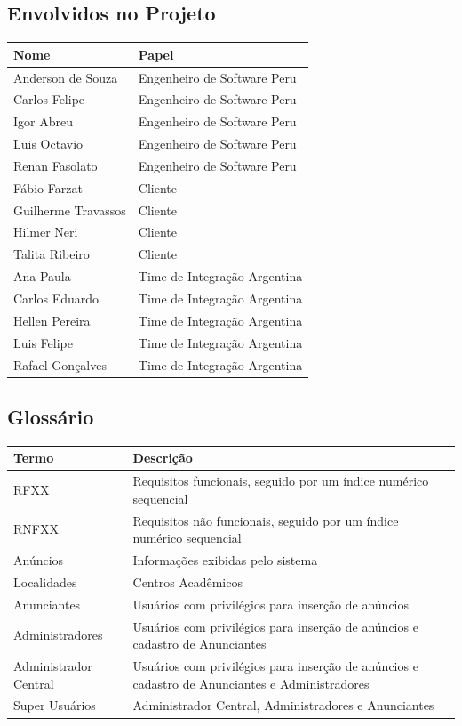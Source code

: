 \documentclass[a4paper, 12pt]{article}
\begin{document}
\subsection{Envolvidos no Projeto}
\begin{table}[ht]
	\centering

	\begin{tabular}{p{7cm}p{7cm}}
		\hline
		\cellcolor{gray}Nome&\cellcolor{gray}Papel  \\
		\hline
		Anderson de Souza&Engenheiro de Software Peru\\
		Carlos Felipe&Engenheiro de Software Peru\\
		Igor Abreu&Engenheiro de Software Peru\\
		Luis Octavio&Engenheiro de Software Peru\\
		Renan Fasolato&Engenheiro de Software Peru\\
		Fábio Farzat&Cliente\\
		Guilherme Travassos&Cliente\\
		Hilmer Neri&Cliente\\
		Talita Ribeiro&Cliente\\
		Ana Paula&Time de Integração Argentina\\
		Carlos Eduardo&Time de Integração Argentina\\
		Hellen Pereira&Time de Integração Argentina\\
		Luis Felipe&Time de Integração Argentina\\
		Rafael Gonçalves&Time de Integração Argentina\\
		\hline
	\end{tabular}
\end{table}
\subsection{Glossário}
\begin{table}[ht]
	\centering

	\begin{tabular}{p{3cm}p{12cm}}
		\hline
		\cellcolor{gray}Termo&\cellcolor{gray}Descrição  \\
		\hline
		RFXX&Requisitos funcionais, seguido por um índice numérico sequencial\\
		RNFXX&Requisitos não funcionais, seguido por um índice numérico sequencial\\
        An\'{u}ncios&Informa\c{c}\~{o}es exibidas pelo sistema\\
        Localidades&Centros Acad\^{e}micos\\
        Anunciantes&Usu\'{a}rios com privil\'{e}gios para inser\c{c}\~{a}o de an\'{u}ncios\\
        Administradores&Usu\'{a}rios com privil\'{e}gios para inser\c{c}\~{a}o de an\'{u}ncios e cadastro de Anunciantes\\
        Administrador Central&Usu\'{a}rios com privil\'{e}gios para inser\c{c}\~{a}o de an\'{u}ncios e cadastro de Anunciantes e Administradores\\
        Super Usu\'{a}rios&Administrador Central, Administradores e Anunciantes\\
		\hline
	\end{tabular}
\end{table}
\end{document}
